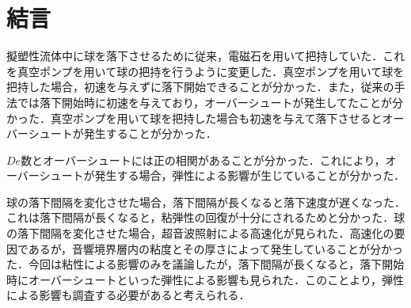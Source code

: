 \clearpage
\section{結言}

擬塑性流体中に球を落下させるために従来，電磁石を用いて把持していた．これを真空ポンプを用いて球の把持を行うように変更した．真空ポンプを用いて球を把持した場合，初速を与えずに落下開始できることが分かった．また，従来の手法では落下開始時に初速を与えており，オーバーシュートが発生してたことが分かった．真空ポンプを用いて球を把持した場合も初速を与えて落下させるとオーバーシュートが発生することが分かった．

$De$数とオーバーシュートには正の相関があることが分かった．これにより，オーバーシュートが発生する場合，弾性による影響が生じていることが分かった．

球の落下間隔を変化させた場合，落下間隔が長くなると落下速度が遅くなった．これは落下間隔が長くなると，粘弾性の回復が十分にされるためと分かった．球の落下間隔を変化させた場合，超音波照射による高速化が見られた．高速化の要因であるが，音響境界層内の粘度とその厚さによって発生していることが分かった．今回は粘性による影響のみを議論したが，落下間隔が長くなると，落下開始時にオーバーシュートといった弾性による影響も見られた．このことより，弾性による影響も調査する必要があると考えられる．

